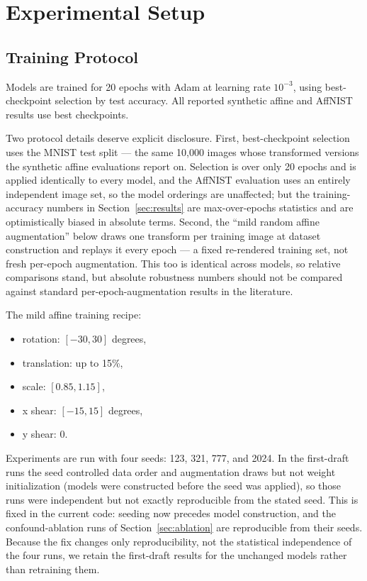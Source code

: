 \documentclass[11pt]{article}
\begin{document}
\section{Experimental Setup}

\subsection{Training Protocol}
Models are trained for 20 epochs with Adam at learning rate $10^{-3}$, using best-checkpoint selection by test accuracy. All reported synthetic affine and AffNIST results use best checkpoints.

Two protocol details deserve explicit disclosure. First, best-checkpoint selection uses the MNIST test split --- the same 10,000 images whose transformed versions the synthetic affine evaluations report on. Selection is over only 20 epochs and is applied identically to every model, and the AffNIST evaluation uses an entirely independent image set, so the model orderings are unaffected; but the training-accuracy numbers in Section~\ref{sec:results} are max-over-epochs statistics and are optimistically biased in absolute terms. Second, the ``mild random affine augmentation'' below draws one transform per training image at dataset construction and replays it every epoch --- a fixed re-rendered training set, not fresh per-epoch augmentation. This too is identical across models, so relative comparisons stand, but absolute robustness numbers should not be compared against standard per-epoch-augmentation results in the literature.

The mild affine training recipe:
\begin{itemize}
  \item rotation: $[-30, 30]$ degrees,
  \item translation: up to 15\%,
  \item scale: $[0.85, 1.15]$,
  \item x shear: $[-15, 15]$ degrees,
  \item y shear: 0.
\end{itemize}

Experiments are run with four seeds: 123, 321, 777, and 2024. In the first-draft runs the seed controlled data order and augmentation draws but not weight initialization (models were constructed before the seed was applied), so those runs were independent but not exactly reproducible from the stated seed. This is fixed in the current code: seeding now precedes model construction, and the confound-ablation runs of Section~\ref{sec:ablation} are reproducible from their seeds. Because the fix changes only reproducibility, not the statistical independence of the four runs, we retain the first-draft results for the unchanged models rather than retraining them.
\end{document}
